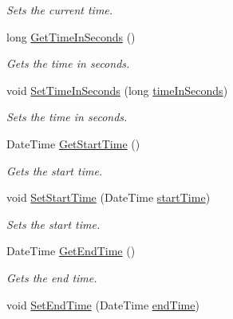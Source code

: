 \begin{DoxyCompactItemize}
\begin{DoxyCompactList}\small\item\em Sets the current time. \end{DoxyCompactList}\item 
long \hyperlink{classcom_1_1shephertz_1_1app42_1_1paas_1_1sdk_1_1csharp_1_1timer_1_1_timer_a896ffceeec3db2fc578bd8beb4c0a330}{Get\+Time\+In\+Seconds} ()
\begin{DoxyCompactList}\small\item\em Gets the time in seconds. \end{DoxyCompactList}\item 
void \hyperlink{classcom_1_1shephertz_1_1app42_1_1paas_1_1sdk_1_1csharp_1_1timer_1_1_timer_af84592138a0e89fff0d6c760a4427c80}{Set\+Time\+In\+Seconds} (long \hyperlink{classcom_1_1shephertz_1_1app42_1_1paas_1_1sdk_1_1csharp_1_1timer_1_1_timer_aa3182edb844b47f63267f2b68b022a43}{time\+In\+Seconds})
\begin{DoxyCompactList}\small\item\em Sets the time in seconds. \end{DoxyCompactList}\item 
Date\+Time \hyperlink{classcom_1_1shephertz_1_1app42_1_1paas_1_1sdk_1_1csharp_1_1timer_1_1_timer_a0fe3e4da885e4c842e1de5c551fd2476}{Get\+Start\+Time} ()
\begin{DoxyCompactList}\small\item\em Gets the start time. \end{DoxyCompactList}\item 
void \hyperlink{classcom_1_1shephertz_1_1app42_1_1paas_1_1sdk_1_1csharp_1_1timer_1_1_timer_a4278143e80a7ee836d2a71e43b0388b0}{Set\+Start\+Time} (Date\+Time \hyperlink{classcom_1_1shephertz_1_1app42_1_1paas_1_1sdk_1_1csharp_1_1timer_1_1_timer_aae095552c437642003d8404fe624f433}{start\+Time})
\begin{DoxyCompactList}\small\item\em Sets the start time. \end{DoxyCompactList}\item 
Date\+Time \hyperlink{classcom_1_1shephertz_1_1app42_1_1paas_1_1sdk_1_1csharp_1_1timer_1_1_timer_a388663e7e20b7b7a6d88d14debee0680}{Get\+End\+Time} ()
\begin{DoxyCompactList}\small\item\em Gets the end time. \end{DoxyCompactList}\item 
void \hyperlink{classcom_1_1shephertz_1_1app42_1_1paas_1_1sdk_1_1csharp_1_1timer_1_1_timer_acc9d56b22fda9bb8e9833efda5261f96}{Set\+End\+Time} (Date\+Time \hyperlink{classcom_1_1shephertz_1_1app42_1_1paas_1_1sdk_1_1csharp_1_1timer_1_1_timer_a4ab4fc1121493a5f2c467f7e4421fe5b}{end\+Time})

\end{DoxyCompactItemize}
